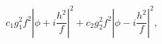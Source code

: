 \begin{equation}
\label{quartic}
c_1 g_1^2 f^2 \left| \phi + i \frac{h^2}{f} \right|^2 + c_2 g_2^2 f^2
\left| \phi - i \frac{h^2}{f} \right|^2,
\end{equation}

